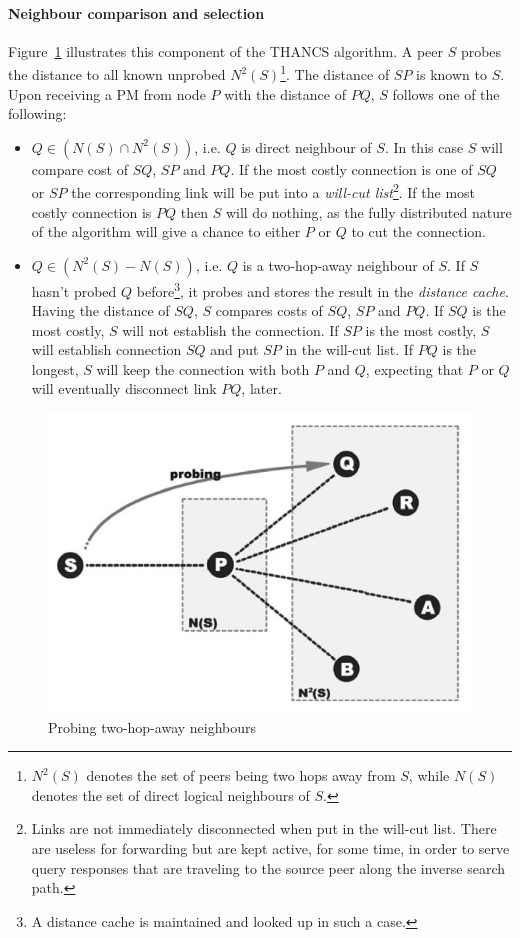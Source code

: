 \documentclass[a4paper,10pt]{article}
\begin{document}
\paragraph{Neighbour comparison and selection}
Figure~\ref{figure:thancs} illustrates this component of the THANCS algorithm. A peer $S$ probes the distance to all known unprobed $N^2(S)$\footnote{$N^2(S)$ denotes the set of peers being two hops away from $S$, while $N(S)$ denotes the set of direct logical neighbours of $S$.}. The distance of $SP$ is known to $S$. Upon receiving a PM from node $P$ with the distance of $PQ$, $S$ follows one of the following:
\begin{itemize}
  \item $Q \in \left( N(S) \cap N^2(S) \right)$, i.e. $Q$ is direct neighbour of $S$. In this case $S$ will compare cost of $SQ$, $SP$ and $PQ$. If the most costly connection is one of $SQ$ or $SP$ the corresponding link will be put into a \emph{will-cut list}\footnote{Links are not immediately disconnected when put in the will-cut list. There are useless for forwarding but are kept active, for some time, in order to serve query responses that are traveling to the source peer along the inverse search path.}. If the most costly connection is $PQ$ then $S$ will do nothing, as the fully distributed nature of the algorithm will give a chance to either $P$ or $Q$ to cut the connection.
  \item $Q \in \left( N^2(S) - N(S) \right)$, i.e. $Q$ is a two-hop-away neighbour of $S$. If $S$ hasn't probed $Q$ before\footnote{A distance cache is maintained and looked up in such a case.}, it probes and stores the result in the \emph{distance cache}. Having the distance of $SQ$, $S$ compares costs of $SQ$, $SP$ and $PQ$. If $SQ$ is the most costly, $S$ will not establish the connection. If $SP$ is the most costly, $S$ will establish connection $SQ$ and put $SP$ in the will-cut list. If $PQ$ is the longest, $S$ will keep  the connection with both $P$ and $Q$, expecting that $P$ or $Q$ will eventually disconnect link $PQ$, later.
\end{itemize}

\begin{figure}
\centering
  \includegraphics[scale=0.4]{img/thancs.jpeg}
\caption{Probing two-hop-away neighbours}
\label{figure:thancs}
\end{figure}
\end{document}
